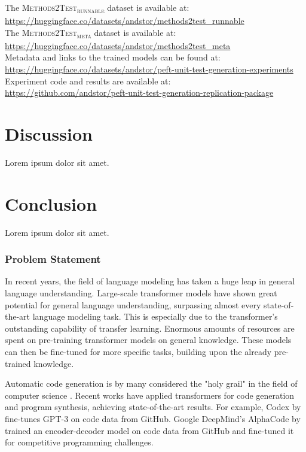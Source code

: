 \documentclass[12pt]{book}
\begin{document}
\noindent The \textsc{Methods2Test\textsubscript{runnable}} dataset is available at:\\
\url{https://huggingface.co/datasets/andstor/methods2test_runnable}\\

\noindent The \textsc{Methods2Test\textsubscript{meta}} dataset is available at:\\
\url{https://huggingface.co/datasets/andstor/methods2test_meta}\\

\noindent Metadata and links to the trained models can be found at:\\
\url{https://huggingface.co/datasets/andstor/peft-unit-test-generation-experiments}\\

\noindent Experiment code and results are available at:\\
\url{https://github.com/andstor/peft-unit-test-generation-replication-package}







\chapter{Discussion}
Lorem ipsum dolor sit amet.

\chapter{Conclusion}
Lorem ipsum dolor sit amet.



\subsection{Problem Statement}
In recent years, the field of language modeling has taken a huge leap in general language understanding. Large-scale transformer models \cite{vaswani2017attention} have shown great potential for general language understanding, surpassing almost every state-of-the-art language modeling task. This is especially due to the transformer's outstanding capability of transfer learning. Enormous amounts of resources are spent on pre-training transformer models on general knowledge. These models can then be fine-tuned for more specific tasks, building upon the already pre-trained knowledge.

Automatic code generation is by many considered the "holy grail" in the field of computer science \cite{PGL-010}. Recent works have applied transformers for code generation and program synthesis, achieving state-of-the-art results. For example, Codex by \textcite{chen2021codex} fine-tunes GPT-3 \cite{brown2020language} on code data from GitHub. Google DeepMind's AlphaCode by \textcite{li2022competition} trained an encoder-decoder model on code data from GitHub and fine-tuned it for competitive programming challenges.
\end{document}
